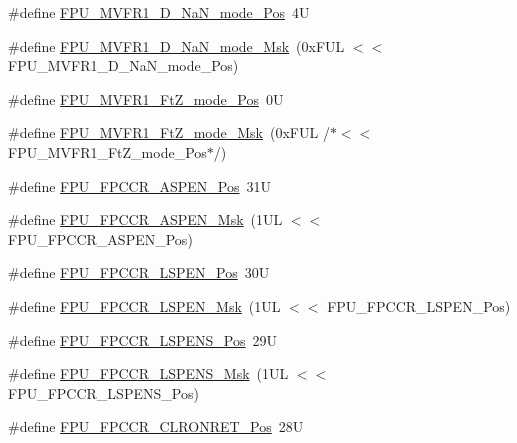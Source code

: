 \begin{DoxyCompactItemize}
\#define \mbox{\hyperlink{group___c_m_s_i_s___f_p_u_gae34d7ce42e50e2f1ea3e654fd3ba690a}{F\+P\+U\+\_\+\+M\+V\+F\+R1\+\_\+\+D\+\_\+\+Na\+N\+\_\+mode\+\_\+\+Pos}}~4U
\item 
\#define \mbox{\hyperlink{group___c_m_s_i_s___f_p_u_gad6af7c4632dba5a417307d456fe9b8a7}{F\+P\+U\+\_\+\+M\+V\+F\+R1\+\_\+\+D\+\_\+\+Na\+N\+\_\+mode\+\_\+\+Msk}}~(0x\+F\+U\+L $<$$<$ F\+P\+U\+\_\+\+M\+V\+F\+R1\+\_\+\+D\+\_\+\+Na\+N\+\_\+mode\+\_\+\+Pos)
\item 
\#define \mbox{\hyperlink{group___c_m_s_i_s___f_p_u_ga7faa5bfa85036f8511793234cbbc2409}{F\+P\+U\+\_\+\+M\+V\+F\+R1\+\_\+\+Ft\+Z\+\_\+mode\+\_\+\+Pos}}~0U
\item 
\#define \mbox{\hyperlink{group___c_m_s_i_s___f_p_u_gac566bde39a7afcceffbb21d830c269c1}{F\+P\+U\+\_\+\+M\+V\+F\+R1\+\_\+\+Ft\+Z\+\_\+mode\+\_\+\+Msk}}~(0x\+F\+U\+L /$\ast$$<$$<$ F\+P\+U\+\_\+\+M\+V\+F\+R1\+\_\+\+Ft\+Z\+\_\+mode\+\_\+\+Pos$\ast$/)
\item 
\#define \mbox{\hyperlink{group___c_m_s_i_s___f_p_u_ga4228a923ddf665f868e56b4b9e9bff7b}{F\+P\+U\+\_\+\+F\+P\+C\+C\+R\+\_\+\+A\+S\+P\+E\+N\+\_\+\+Pos}}~31U
\item 
\#define \mbox{\hyperlink{group___c_m_s_i_s___f_p_u_ga309886ff6bbd25cb13c061c6683c6c0c}{F\+P\+U\+\_\+\+F\+P\+C\+C\+R\+\_\+\+A\+S\+P\+E\+N\+\_\+\+Msk}}~(1\+U\+L $<$$<$ F\+P\+U\+\_\+\+F\+P\+C\+C\+R\+\_\+\+A\+S\+P\+E\+N\+\_\+\+Pos)
\item 
\#define \mbox{\hyperlink{group___c_m_s_i_s___f_p_u_gac7d70e051fe759ad8fed83bf5b5aebc1}{F\+P\+U\+\_\+\+F\+P\+C\+C\+R\+\_\+\+L\+S\+P\+E\+N\+\_\+\+Pos}}~30U
\item 
\#define \mbox{\hyperlink{group___c_m_s_i_s___f_p_u_gaf4ab19de45df6522dd882bc116f938e9}{F\+P\+U\+\_\+\+F\+P\+C\+C\+R\+\_\+\+L\+S\+P\+E\+N\+\_\+\+Msk}}~(1\+U\+L $<$$<$ F\+P\+U\+\_\+\+F\+P\+C\+C\+R\+\_\+\+L\+S\+P\+E\+N\+\_\+\+Pos)
\item 
\#define \mbox{\hyperlink{group___c_m_s_i_s___f_p_u_ga705368bf3c52b5bb4edfbcb3e2631e1c}{F\+P\+U\+\_\+\+F\+P\+C\+C\+R\+\_\+\+L\+S\+P\+E\+N\+S\+\_\+\+Pos}}~29U
\item 
\#define \mbox{\hyperlink{group___c_m_s_i_s___f_p_u_ga73afcf0fe09c69e9625e11035cabb1c0}{F\+P\+U\+\_\+\+F\+P\+C\+C\+R\+\_\+\+L\+S\+P\+E\+N\+S\+\_\+\+Msk}}~(1\+U\+L $<$$<$ F\+P\+U\+\_\+\+F\+P\+C\+C\+R\+\_\+\+L\+S\+P\+E\+N\+S\+\_\+\+Pos)
\item 
\#define \mbox{\hyperlink{group___c_m_s_i_s___f_p_u_ga0b97b2fdac794f4fddab1e4342e0c104}{F\+P\+U\+\_\+\+F\+P\+C\+C\+R\+\_\+\+C\+L\+R\+O\+N\+R\+E\+T\+\_\+\+Pos}}~28U

\end{DoxyCompactItemize}
